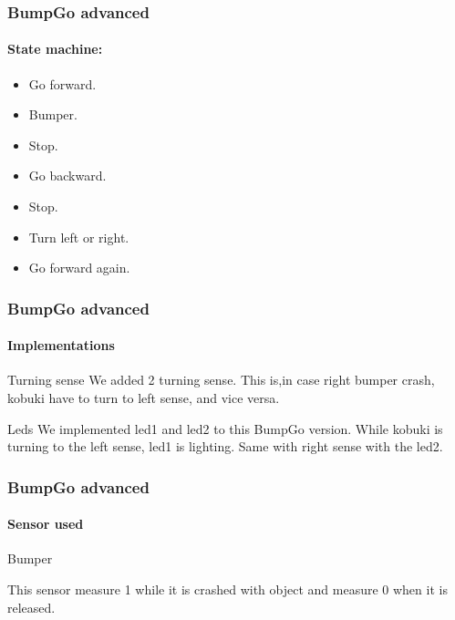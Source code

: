 \documentclass{beamer}
\begin{document}
\begin{frame}
\frametitle{BumpGo advanced}
\framesubtitle{State machine:}	

\begin{itemize}
	\item Go forward. \\ \item Bumper.\\ \item Stop.
	\item Go backward. \\ \item Stop.\\ \item Turn left or right.\\ \item Go forward again.
\end{itemize}
\end{frame}



\begin{frame}
\frametitle{BumpGo advanced}
\framesubtitle{Implementations}
\begin{block}{Turning sense}
	We added 2 turning sense. This is,in case right bumper crash, kobuki have to turn to
	left sense, and vice versa.
\end{block}
\begin{block}{Leds}
	We implemented led1 and led2 to this BumpGo version. While kobuki is turning to the 		left sense, led1 is lighting. Same with right sense with the led2.
\end{block}
\end{frame}


\begin{frame}
\frametitle{BumpGo advanced}
\framesubtitle{Sensor used}

\begin{block}{Bumper}
	
	This sensor measure 1 while it is crashed with object and measure 0 when it is 			    released.
	
\end{block}

\end{frame}


\end{document}
